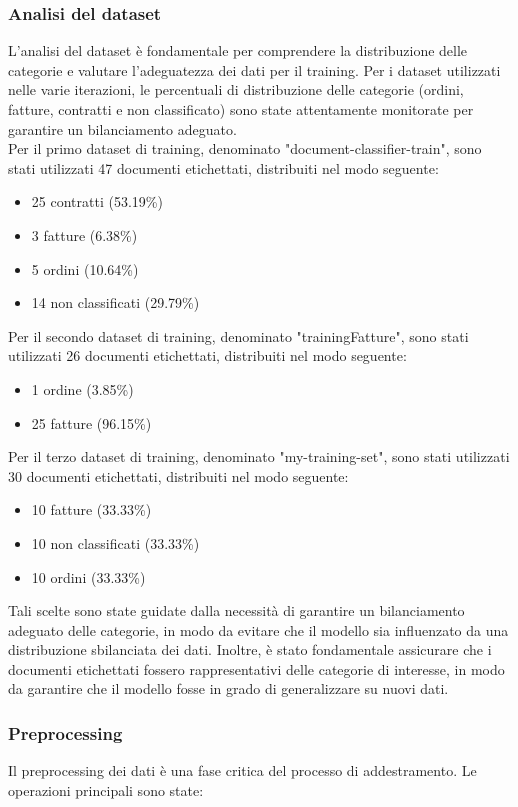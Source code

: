 \subsubsection{Analisi del dataset}
L'analisi del dataset è fondamentale per comprendere la distribuzione delle categorie e valutare l'adeguatezza dei dati per il training. Per i dataset utilizzati nelle varie iterazioni, le percentuali di distribuzione delle categorie (ordini, fatture, contratti e non classificato) sono state attentamente monitorate per garantire un bilanciamento adeguato.\\
Per il primo dataset di training, denominato "document-classifier-train", sono stati utilizzati 47 documenti etichettati, distribuiti nel modo seguente:
\begin{itemize}
    \item 25 contratti (53.19\%)
    \item 3 fatture (6.38\%)
    \item 5 ordini (10.64\%)
    \item 14 non classificati (29.79\%)
\end{itemize}
Per il secondo dataset di training, denominato "trainingFatture", sono stati utilizzati 26 documenti etichettati, distribuiti nel modo seguente:
\begin{itemize}
    \item 1 ordine (3.85\%)
    \item 25 fatture (96.15\%)
\end{itemize}
Per il terzo dataset di training, denominato "my-training-set", sono stati utilizzati 30 documenti etichettati, distribuiti nel modo seguente:
\begin{itemize}
    \item 10 fatture (33.33\%)
    \item 10 non classificati (33.33\%)
    \item 10 ordini (33.33\%)
\end{itemize}
Tali scelte sono state guidate dalla necessità di garantire un bilanciamento adeguato delle categorie, in modo da evitare che il modello sia influenzato da una distribuzione sbilanciata dei dati. Inoltre, è stato fondamentale assicurare che i documenti etichettati fossero rappresentativi delle categorie di interesse, in modo da garantire che il modello fosse in grado di generalizzare su nuovi dati.

\subsubsection{Preprocessing}
Il preprocessing dei dati è una fase critica del processo di addestramento. Le operazioni principali sono state:

